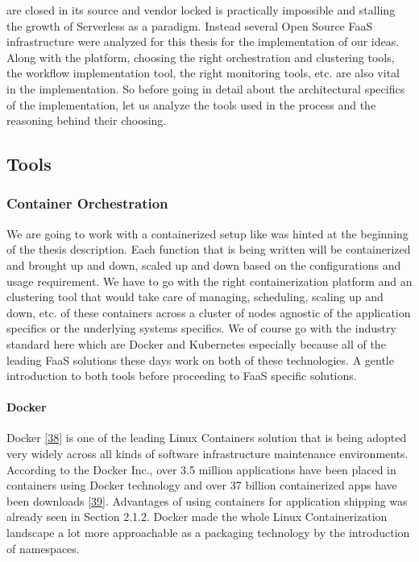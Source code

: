 \documentclass[12pt,titlepage]{article}
\begin{document}
are closed in its source and vendor locked is practically impossible and
stalling the growth of Serverless as a paradigm. Instead several Open Source
FaaS infrastructure were analyzed for this thesis for the implementation of our
ideas. Along with the platform, choosing the right orchestration and clustering tools, the
workflow implementation tool, the right monitoring tools, etc. are also vital in
the implementation. So before going in detail about the architectural specifics
of the implementation, let us analyze the tools used in the process and the
reasoning behind their choosing.

\subsection{Tools}
\label{sec:org66d93b2}
\subsubsection{Container Orchestration}
\label{sec:orgefeb169}
We are going to work with a containerized setup like was hinted at the beginning
of the thesis description. Each function that is being written will be
containerized and brought up and down, scaled up and down based on the
configurations and usage requirement. We have to go with the right
containerization platform and an clustering tool that would take care of
managing, scheduling, scaling up and down, etc. of these containers across a
cluster of nodes agnostic of the application specifics or the underlying systems
specifics. We of course go with the industry standard here which are Docker and
Kubernetes especially because all of the leading FaaS solutions these days work
on both of these technologies. A gentle introduction to both tools before
proceeding to FaaS specific solutions.
\paragraph{Docker}
\label{sec:orga76d19c}
Docker \hyperref[ref:38]{[38}] is one of the leading Linux Containers solution that is being
adopted very widely across all kinds of software infrastructure maintenance
environments. According to the Docker Inc., over 3.5 million applications have
been placed in containers using Docker technology and over 37 billion
containerized apps have been downloads \hyperref[ref:39]{[39}]. Advantages of using
containers for application shipping was already seen in Section 2.1.2. Docker
made the whole Linux Containerization landscape a lot more approachable as a
packaging technology by the introduction of namespaces.
\end{document}
